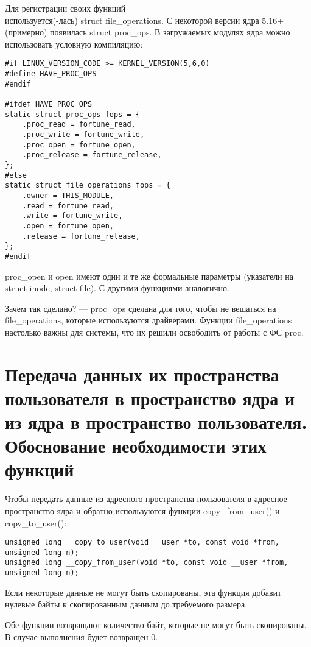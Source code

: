 Для регистрации своих функций \\ используется(-лась) struct file\_operations. С некоторой версии ядра 5.16+ (примерно) появилась struct proc\_ops. В загружаемых модулях ядра можно использовать условную компиляцию:

\begin{lstlisting}
#if LINUX_VERSION_CODE >= KERNEL_VERSION(5,6,0)
#define HAVE_PROC_OPS
#endif

#ifdef HAVE_PROC_OPS
static struct proc_ops fops = {
    .proc_read = fortune_read,
    .proc_write = fortune_write,
    .proc_open = fortune_open,
    .proc_release = fortune_release,
};
#else
static struct file_operations fops = {
    .owner = THIS_MODULE,
    .read = fortune_read,
    .write = fortune_write,
    .open = fortune_open,
    .release = fortune_release,
};
#endif
\end{lstlisting}

proc\_open и open имеют одни и те же формальные параметры (указатели на struct inode, struct file). С другими функциями аналогично.

Зачем так сделано? --- proc\_ops сделана для того, чтобы не вешаться на \\ file\_operations, которые используются драйверами. Функции file\_operations настолько важны для системы, что их решили освободить от работы с ФС proc.

\section{Передача данных их пространства пользователя в пространство ядра и из ядра в пространство пользователя. Обоснование необходимости этих функций}

Чтобы передать данные из адресного пространства пользователя в адресное пространство ядра и обратно используются функции copy\_from\_user() и  \\ copy\_to\_user():

\begin{lstlisting}
unsigned long __copy_to_user(void __user *to, const void *from, unsigned long n);
unsigned long __copy_from_user(void *to, const void __user *from, unsigned long n);
\end{lstlisting}

Если некоторые данные не могут быть скопированы, эта функция добавит нулевые байты к скопированным данным до требуемого размера.

Обе функции возвращают количество байт, которые не могут быть скопированы. В случае выполнения будет возвращен 0.

